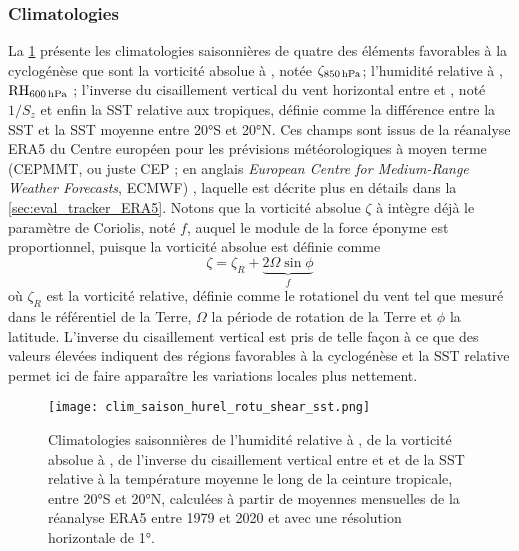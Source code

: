 \documentclass[../main.tex]{subfiles}
\begin{document}
\subsubsection*{Climatologies}\label{sec:climato_ingredients}

La \cref{fig:clim_ingredients} présente les climatologies saisonnières de quatre des éléments favorables à la cyclogénèse que sont la vorticité absolue à
, notée $\zeta_{\text{\hPa{850}}}$; l'humidité relative à , $\text{RH}_{\text{\hPa{600}}}$ ; l'inverse du cisaillement vertical du vent
horizontal entre  et , noté $1/S_z$ et enfin la SST relative aux tropiques, définie comme la différence entre la SST et la SST moyenne entre
\ang{20}S et \ang{20}N. Ces champs sont issus de la réanalyse ERA5 du Centre européen pour les prévisions météorologiques à moyen terme (CEPMMT, ou juste CEP ;
en anglais \textit{European Centre for Medium-Range Weather Forecasts}, ECMWF) \parencite{hersbach_era5_2020}, laquelle est décrite plus en détails dans la
\cref{sec:eval_tracker_ERA5}. Notons que la vorticité absolue $\zeta$ à  intègre déjà le paramètre de Coriolis, noté $f$, auquel le module de la force
éponyme est proportionnel, puisque la vorticité absolue est définie comme
%
\begin{equation*}
    \zeta = \zeta_R + \underbrace{2 \Omega \sin \phi}_{f}
\end{equation*}
%
où $\zeta_R$ est la vorticité relative, définie comme le rotationel du vent tel que mesuré dans le référentiel de la Terre, $\Omega$ la période de
rotation de la Terre et $\phi$ la latitude. L'inverse du cisaillement vertical est pris de telle façon à ce que des valeurs élevées indiquent des régions
favorables à la cyclogénèse et la SST relative permet ici de faire apparaître les variations locales plus nettement.

\begin{figure}[tp]
    \centering
    \texttt{[image: clim\_saison\_hurel\_rotu\_shear\_sst.png]}
    \caption{Climatologies saisonnières de l'humidité relative à , de la vorticité absolue à , de l'inverse du cisaillement vertical entre
     et  et de la SST relative à la température moyenne le long de la ceinture tropicale, entre \ang{20}S et \ang{20}N, calculées à partir de
    moyennes mensuelles de la réanalyse ERA5 entre 1979 et 2020 et avec une résolution horizontale de \ang{1}.}
    \label{fig:clim_ingredients}
\end{figure}
\end{document}
